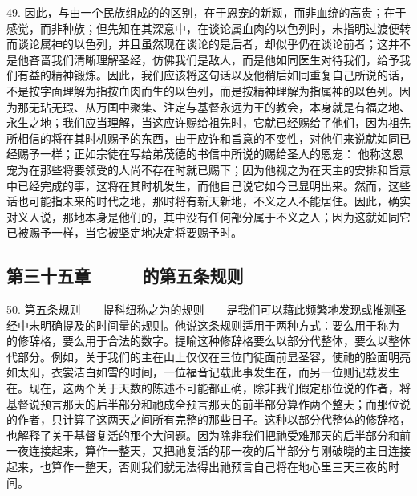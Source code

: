 49. 因此，与由一个民族组成的的区别，在于恩宠的新颖，而非血统的高贵；在于感觉，而非种族；但先知在其深意中，在谈论属血肉的以色列时，未指明过渡便转而谈论属神的以色列，并且虽然现在谈论的是后者，却似乎仍在谈论前者；这并不是他吝啬我们清晰理解圣经，仿佛我们是敌人，而是他如同医生对待我们，给予我们有益的精神锻炼。因此，我们应该将这句话以及他稍后如同重复自己所说的话，不是按字面理解为指按血肉而生的以色列，而是按精神理解为指属神的以色列。因为那无玷无瑕、从万国中聚集、注定与基督永远为王的教会，本身就是有福之地、永生之地；我们应当理解，当这应许赐给祖先时，它就已经赐给了他们，因为祖先所相信的将在其时机赐予的东西，由于应许和旨意的不变性，对他们来说就如同已经赐予一样；正如宗徒在写给弟茂德的书信中所说的赐给圣人的恩宠： 他称这恩宠为在那些将要领受的人尚不存在时就已赐下；因为他视之为在天主的安排和旨意中已经完成的事，这将在其时机发生，而他自己说它如今已显明出来。然而，这些话也可能指未来的时代之地，那时将有新天新地，不义之人不能居住。因此，确实对义人说，那地本身是他们的，其中没有任何部分属于不义之人；因为这就如同它已被赐予一样，当它被坚定地决定将要赐予时。\par


\subsection{第三十五章 —— 的第五条规则}

50. 第五条规则——提科纽称之为的规则——是我们可以藉此频繁地发现或推测圣经中未明确提及的时间量的规则。他说这条规则适用于两种方式：要么用于称为  的修辞格，要么用于合法的数字。提喻这种修辞格要么以部分代整体，要么以整体代部分。例如，关于我们的主在山上仅仅在三位门徒面前显圣容，使祂的脸面明亮如太阳，衣裳洁白如雪的时间，一位福音记载此事发生在，而另一位则记载发生在。现在，这两个关于天数的陈述不可能都正确，除非我们假定那位说的作者，将基督说预言那天的后半部分和祂成全预言那天的前半部分算作两个整天；而那位说的作者，只计算了这两天之间所有完整的那些日子。这种以部分代整体的修辞格，也解释了关于基督复活的那个大问题。因为除非我们把祂受难那天的后半部分和前一夜连接起来，算作一整天，又把祂复活的那一夜的后半部分与刚破晓的主日连接起来，也算作一整天，否则我们就无法得出祂预言自己将在地心里三天三夜的时间。\par

